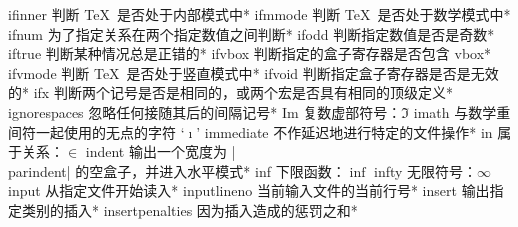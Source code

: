 \capcs ifinner {判断 \TeX\ 是否处于内部模式中}*{\@ifinner}
\capcs ifmmode {判断 \TeX\ 是否处于数学模式中}*{\@ifmmode}
\capcs ifnum {为了指定关系在两个指定数值之间判断}*{\@ifnum}
\capcs ifodd {判断指定数值是否是奇数}*{\@ifodd}
\capcs iftrue {判断某种情况总是正错的}*{\@iftrue}
\capcs ifvbox {判断指定的盒子寄存器是否包含 vbox}*{\@ifvbox}
\capcs ifvmode {判断 \TeX\ 是否处于竖直模式中}*{\@ifvmode}
\capcs ifvoid {判断指定盒子寄存器是否是无效的}*{\@ifvoid}
\capcs ifx {判断两个记号是否是相同的，或两个宏是否具有相同的顶级定义}*{\@ifx}
\capcs ignorespaces {忽略任何接随其后的间隔记号}*{}
\capcs Im {复数虚部符号：$\Im$}{}{}
\capcs imath {与数学重间符一起使用的无点的字符 `$\imath$'}{}{}
\capcs immediate {不作延迟地进行特定的文件操作}*{}
\capcs in {属于关系：$\in$}{}{}
\capcs indent {输出一个宽度为 |\\parindent| 的空盒子，并进入水平模式}*{}
\capcs inf {下限函数：$\inf$}{}{}
\capcs infty {无限符号：$\infty$}{}{}
\capcs input {从指定文件开始读入}*{}
\capcs inputlineno {当前输入文件的当前行号}*{}
\capcs insert {输出指定类别的插入}*{}
\capcs insertpenalties {因为插入造成的惩罚之和}*{}
